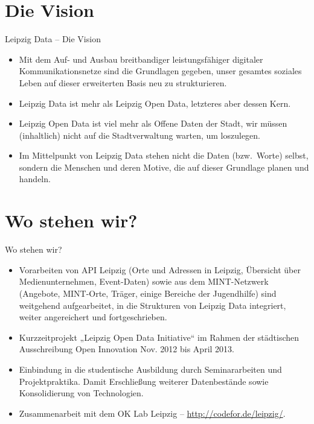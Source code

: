 \documentclass{beamer}
\begin{document}
\section{Die Vision}
\begin{frame}{Leipzig Data – Die Vision}{}
  \begin{itemize}
  \item Mit dem Auf- und Ausbau breitbandiger leistungsfähiger digitaler
    Kommunikationsnetze sind die Grundlagen gegeben, unser gesamtes soziales
    Leben auf dieser erweiterten Basis neu zu strukturieren.
  \item {Leipzig Data} ist mehr als {Leipzig Open Data}, letzteres
    aber dessen Kern.
  \item {Leipzig Open Data} ist viel mehr als {Offene Daten der
    Stadt}, wir müssen (inhaltlich) nicht auf die Stadtverwaltung warten, um
    loszulegen.
  \item Im Mittelpunkt von Leipzig Data stehen nicht die Daten (bzw.\ Worte)
    selbst, sondern die Menschen und deren Motive, die auf dieser Grundlage
    {planen} und {handeln}.
  \end{itemize}
\end{frame}

\section{Wo stehen wir?}
\begin{frame}{Wo stehen wir?}{}\small
  \begin{itemize}
  \item Vorarbeiten von API Leipzig (Orte und Adressen in Leipzig, Übersicht
    über Medienunternehmen, Event-Daten) sowie aus dem MINT-Netzwerk
    (Angebote, MINT-Orte, Träger, einige Bereiche der Jugendhilfe) sind
    weitgehend aufgearbeitet, in die Strukturen von Leipzig Data integriert,
    weiter angereichert und fortgeschrieben.
  \item Kurzzeitprojekt „Leipzig Open Data Initiative“ im Rahmen der
    städtischen Ausschreibung Open Innovation Nov. 2012 bis April 2013.
  \item Einbindung in die studentische Ausbildung durch Seminararbeiten und 
    Projektpraktika. Damit Erschließung weiterer Datenbestände sowie
    Konsolidierung von Technologien.
  \item Zusammenarbeit mit dem OK Lab Leipzig --
    \url{http://codefor.de/leipzig/}.
  \end{itemize}
\end{frame}
\end{document}
